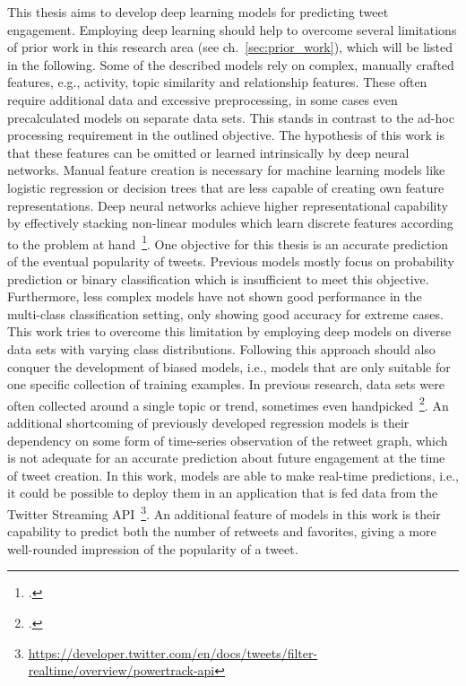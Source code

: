 This thesis aims to develop deep learning models for predicting tweet
engagement.
Employing deep learning should help to overcome several limitations of prior
work in this research area (see ch.~\ref{sec:prior_work}), which will be listed in the following.
Some of the described models rely on complex, manually crafted features, e.g.,
activity, topic similarity and relationship features.
These often require additional data and excessive preprocessing, in some cases
even precalculated models on separate data sets.
This stands in contrast to the ad-hoc processing requirement in the outlined objective.
The hypothesis of this work is that these features can be omitted or
learned intrinsically by deep neural networks.
Manual feature creation is necessary for machine learning models like logistic
regression or decision trees that are less capable of creating own feature
representations.
Deep neural networks achieve higher representational capability by effectively
stacking non-linear modules which learn discrete features according to the problem at
hand~\footcite{LeCun2015}.
One objective for this thesis is an accurate prediction of the eventual popularity
of tweets.
Previous models mostly focus on probability prediction or binary classification
which is insufficient to meet this objective.
Furthermore, less complex models have not shown good performance in the multi-class
classification setting, only showing good accuracy for extreme cases.
This work tries to overcome this limitation by employing deep models on diverse
data sets with varying class distributions.
Following this approach should also conquer the development of biased models,
i.e., models that are only suitable for one specific collection of training
examples.
In previous research, data sets were often collected around a single topic or
trend, sometimes even handpicked~\footcite{Zaman2014}.
An additional shortcoming of previously developed regression models is their dependency
on some form of time-series observation of the retweet graph, which is not adequate for
an accurate prediction about future engagement at the time of tweet creation.
In this work, models are able to make real-time predictions, i.e., it could
be possible to deploy them in an application that is fed data from the Twitter
Streaming API~\footnote{\url{https://developer.twitter.com/en/docs/tweets/filter-realtime/overview/powertrack-api}}.
An additional feature of models in this work is their capability to predict both the
number of retweets and favorites, giving a more well-rounded impression of the
popularity of a tweet.

